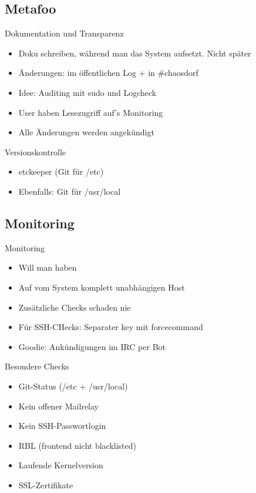 \documentclass{beamer}
\begin{document}
\subsection{Metafoo}
\begin{frame}{Dokumentation und Transparenz}
	\begin{itemize}
		\item Doku schreiben, während man das System aufsetzt. Nicht später
		\item Änderungen: im öffentlichen Log + in \#chaosdorf
		\item Idee: Auditing mit sudo und Logcheck
		\item User haben Lesezugriff auf's Monitoring
		\item Alle Änderungen werden angekündigt
	\end{itemize}
\end{frame}

\begin{frame}{Versionskontrolle}
	\begin{itemize}
		\item etckeeper (Git für /etc)
		\item Ebenfalls: Git für /usr/local
	\end{itemize}
\end{frame}

\subsection{Monitoring}
\begin{frame}{Monitoring}
	\begin{itemize}
		\item Will man haben
		\item Auf vom System komplett unabhängigen Host
		\item Zusätzliche Checks schaden nie
		\item Für SSH-CHecks: Separater key mit forcecommand
		\item Goodie: Ankündigungen im IRC per Bot
	\end{itemize}
\end{frame}

\begin{frame}{Besondere Checks}
	\begin{itemize}
		\item Git-Status (/etc + /usr/local)
		\item Kein offener Mailrelay
		\item Kein SSH-Passwortlogin
		\item RBL (frontend nicht blacklisted)
		\item Laufende Kernelversion
		\item SSL-Zertifikate
	\end{itemize}
\end{frame}
\end{document}
